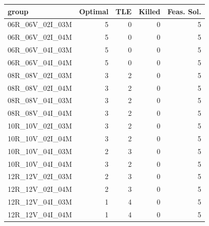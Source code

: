 
\begin{tabular}{lrrrr}
\toprule
group & Optimal & TLE & Killed & Feas. Sol.\\
\midrule
06R\_06V\_02I\_03M & 5 & 0 & 0 & 5\\
06R\_06V\_02I\_04M & 5 & 0 & 0 & 5\\
06R\_06V\_04I\_03M & 5 & 0 & 0 & 5\\
06R\_06V\_04I\_04M & 5 & 0 & 0 & 5\\
08R\_08V\_02I\_03M & 3 & 2 & 0 & 5\\
\addlinespace
08R\_08V\_02I\_04M & 3 & 2 & 0 & 5\\
08R\_08V\_04I\_03M & 3 & 2 & 0 & 5\\
08R\_08V\_04I\_04M & 3 & 2 & 0 & 5\\
10R\_10V\_02I\_03M & 3 & 2 & 0 & 5\\
10R\_10V\_02I\_04M & 3 & 2 & 0 & 5\\
\addlinespace
10R\_10V\_04I\_03M & 2 & 3 & 0 & 5\\
10R\_10V\_04I\_04M & 3 & 2 & 0 & 5\\
12R\_12V\_02I\_03M & 2 & 3 & 0 & 5\\
12R\_12V\_02I\_04M & 2 & 3 & 0 & 5\\
12R\_12V\_04I\_03M & 1 & 4 & 0 & 5\\
\addlinespace
12R\_12V\_04I\_04M & 1 & 4 & 0 & 5\\
\bottomrule
\end{tabular}
